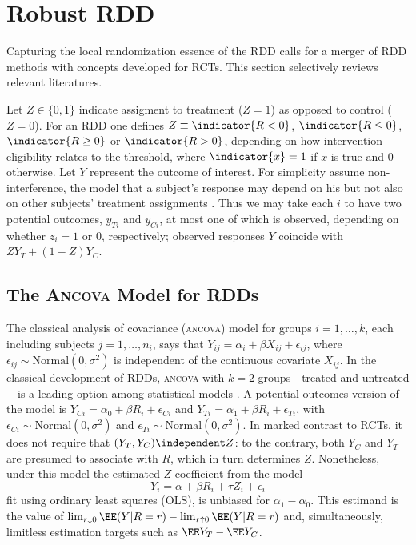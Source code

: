 \section{Robust RDD}
Capturing the local randomization essence of the RDD calls for
a merger of RDD methods with concepts developed for RCTs. This
section selectively reviews relevant literatures.

Let $Z \in \{0,1\}$ indicate assigment to treatment ($Z=1$) as opposed to control
($Z=0$).  For an RDD one defines $Z \equiv \indicator{R< 0}$,
$\indicator{R \leq 0}$, $\indicator{R\geq 0}$ or $\indicator{R > 0}$,
depending on how intervention eligibility relates to the threshold,
where $\indicator{x}=1$ if $x$ is true and $0$ otherwise.
Let $Y$ represent the outcome of interest.
For simplicity assume non-interference, the model that
a subject's response may depend on his but not also on other subjects'
treatment assignments \citep{cox:1958,rubin:1978}.  Thus we may take each $i$
to have two potential outcomes, $y_{Ti}$ and $y_{Ci}$, at most one of which is observed, depending on whether $z_i=1$ or $0$, respectively;
 observed
responses $Y$ coincide with $ZY_{T}+(1-Z)Y_{C}$.

\subsection{The \textsc{Ancova} Model for RDDs}\label{sec:robust-analys-covar}

The classical analysis of covariance (\textsc{ancova}) model for
groups $i=1,\ldots, k$, each including subjects $j=1, \ldots, n_{i}$,
says that
$Y_{ij} = \alpha_{i} + \beta X_{ij} + \epsilon_{ij}$, where $\epsilon_{ij}
\sim \mathrm{Normal}(0, \sigma^{2})$ is independent of the continuous
covariate $X_{ij}$.
In the classical development of RDDs, \textsc{ancova} with $k=2$
groups---treated and untreated---is a leading option among statistical
models
\citep{thistlethwaite1960regression}.
A potential outcomes version of the model is
 $Y_{Ci} = \alpha_{0} + \beta R_{i} + \epsilon_{Ci}$ and
$Y_{Ti} = \alpha_{1}  + \beta R_{i} + \epsilon_{Ti}$, with
 $\epsilon_{Ci} \sim \mathrm{Normal}(0, \sigma^{2})$ and
 $\epsilon_{Ti} \sim \mathrm{Normal}(0, \sigma^{2})$.
In marked contrast to RCTs, it does
not require that $(Y_{T}, Y_{C}) \independent Z$: to the contrary, both
$Y_{C}$ and $Y_{T}$ are presumed to associate with $R$, which in turn
determines $Z$.
Nonetheless, under this model the estimated $Z$ coefficient from the
model
\begin{equation}\label{eq:classicOLS}
Y_i=\alpha+\beta R_i+\tau Z_i+\epsilon_i
\end{equation}
fit using ordinary least squares (OLS), is unbiased for
$\alpha_{1} - \alpha_{0}$.
This estimand is the value of  $\lim_{r\downarrow 0} \EE(Y | R=r) -
\lim_{r\uparrow 0} \EE(Y | R=r)$ and, simultaneously,
limitless estimation targets such as $\EE Y_{T}  - \EE Y_{C}$.

